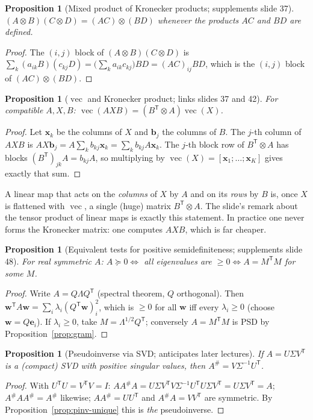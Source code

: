 \documentclass[11pt,a4paper]{article}
\newcommand{\T}{^{\mathsf{T}}}
\newcommand{\pinv}{^{\#}}
\newcommand{\vecop}{\operatorname{vec}}
\theoremstyle{definition}
\theoremstyle{plain}
\newtheorem{proposition}[definition]{Proposition}
\begin{document}
\begin{proposition}[Mixed product of Kronecker products; supplements slide 37]
$(A\otimes B)(C\otimes D)=(AC)\otimes(BD)$ whenever the products $AC$ and $BD$ are defined.
\end{proposition}
\begin{proof}
The $(i,j)$ block of $(A\otimes B)(C\otimes D)$ is $\sum_k(a_{ik}B)(c_{kj}D)=\big(\sum_ka_{ik}c_{kj}\big)BD=(AC)_{ij}BD$, which is the $(i,j)$ block of $(AC)\otimes(BD)$.
\end{proof}

\begin{proposition}[$\vecop$ and Kronecker product; links slides 37 and 42]
For compatible $A,X,B$: $\vecop(AXB)=(B\T\otimes A)\vecop(X)$.
\end{proposition}
\begin{proof}
Let $\mathbf x_k$ be the columns of $X$ and $\mathbf b_j$ the columns of $B$. The $j$-th column of $AXB$ is $A X\mathbf b_j=A\sum_k b_{kj}\mathbf x_k=\sum_k b_{kj}A\mathbf x_k$. The $j$-th block row of $B\T\otimes A$ has blocks $(B\T)_{jk}A=b_{kj}A$, so multiplying by $\vecop(X)=[\mathbf x_1;\dots;\mathbf x_K]$ gives exactly that sum.
\end{proof}

\begin{intuition}
A linear map that acts on the \emph{columns} of $X$ by $A$ and on its \emph{rows} by $B$ is, once $X$ is flattened with $\vecop$, a single (huge) matrix $B\T\otimes A$. The slide's remark about the tensor product of linear maps is exactly this statement. In practice one never forms the Kronecker matrix: one computes $AXB$, which is far cheaper.
\end{intuition}

\begin{proposition}[Equivalent tests for positive semidefiniteness; supplements slide 48]
For real symmetric $A$: $A\succeq0\iff$ all eigenvalues are $\ge0\iff A=M\T M$ for some $M$.
\end{proposition}
\begin{proof}
Write $A=Q\Lambda Q\T$ (spectral theorem, $Q$ orthogonal). Then $\mathbf w\T A\mathbf w=\sum_i\lambda_i(Q\T\mathbf w)_i^2$, which is $\ge0$ for all $\mathbf w$ iff every $\lambda_i\ge0$ (choose $\mathbf w=Q\mathbf e_i$). If $\lambda_i\ge0$, take $M=\Lambda^{1/2}Q\T$; conversely $A=M\T M$ is PSD by Proposition~\ref{prop:gram}.
\end{proof}

\begin{proposition}[Pseudoinverse via SVD; anticipates later lectures]
If $A=U\Sigma V\T$ is a (compact) SVD with positive singular values, then $A\pinv=V\Sigma^{-1}U\T$.
\end{proposition}
\begin{proof}
With $U\T U=V\T V=I$: $AA\pinv A=U\Sigma V\T V\Sigma^{-1}U\T U\Sigma V\T=U\Sigma V\T=A$; $A\pinv AA\pinv=A\pinv$ likewise; $AA\pinv=UU\T$ and $A\pinv A=VV\T$ are symmetric. By Proposition~\ref{prop:pinv-unique} this is \emph{the} pseudoinverse.
\end{proof}
\end{document}
